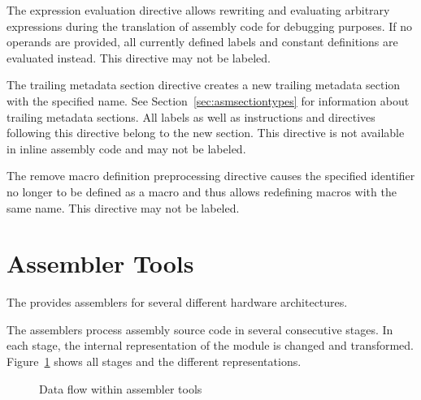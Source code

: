 
The expression evaluation directive allows rewriting and evaluating arbitrary expressions during the translation of assembly code for debugging purposes.
If no operands are provided, all currently defined labels and constant definitions are evaluated instead.
This directive may not be labeled.


The trailing metadata section directive creates a new trailing metadata section with the specified name.
See Section~\ref{sec:asmsectiontypes} for information about trailing metadata sections.
All labels as well as instructions and directives following this directive belong to the new section.
This directive is not available in inline assembly code and may not be labeled.


The remove macro definition preprocessing directive causes the specified identifier no longer to be defined as a macro and thus allows redefining macros with the same name.
This directive may not be labeled.

\section{Assembler Tools}

The \ecs{} provides assemblers for several different hardware architectures.
\interface\seeguide

The assemblers process assembly source code in several consecutive stages.
In each stage, the internal representation of the module is changed and transformed.
Figure~\ref{fig:asmdataflow} shows all stages and the different representations.

\begin{figure}
\caption{Data flow within assembler tools}
\label{fig:asmdataflow}
\end{figure}

